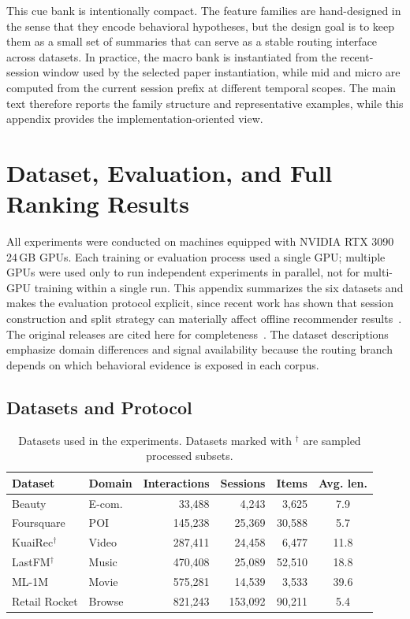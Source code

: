 \documentclass[sigconf,review,anonymous]{acmart}
\begin{document}
This cue bank is intentionally compact. The feature families are hand-designed in the sense that they encode behavioral hypotheses, but the design goal is to keep them as a small set of summaries that can serve as a stable routing interface across datasets. In practice, the macro bank is instantiated from the recent-session window used by the selected paper instantiation, while mid and micro are computed from the current session prefix at different temporal scopes. The main text therefore reports the family structure and representative examples, while this appendix provides the implementation-oriented view.

\section{Dataset, Evaluation, and Full Ranking Results}

All experiments were conducted on machines equipped with NVIDIA RTX 3090 24\,GB GPUs. Each training or evaluation process used a single GPU; multiple GPUs were used only to run independent experiments in parallel, not for multi-GPU training within a single run.
\label{app:data-details}
This appendix summarizes the six datasets and makes the evaluation protocol explicit, since recent work has shown that session construction and split strategy can materially affect offline recommender results~\cite{ji2023leakage,gusak2025timesplit}. The original releases are cited here for completeness~\cite{mcauley2015amazon,yang2015foursquare,gao2022kuairec,celma2010music,harper2015movielens,retailrocket2015dataset}. The dataset descriptions emphasize domain differences and signal availability because the routing branch depends on which behavioral evidence is exposed in each corpus.

\subsection{Datasets and Protocol}

\begin{table}[H]
  \caption{Datasets used in the experiments. Datasets marked with $^\dagger$ are sampled processed subsets.}
  \label{tab:appendix-datasets}
  \centering
  \footnotesize
  \setlength{\tabcolsep}{3.0pt}
  \begin{tabular*}{\columnwidth}{@{\extracolsep{\fill}}llrrrc@{}}
    \toprule
    Dataset & Domain & Interactions & Sessions & Items & Avg. len. \\
    \midrule
    Beauty & E-com. & 33,488 & 4,243 & 3,625 & 7.9 \\
    Foursquare & POI & 145,238 & 25,369 & 30,588 & 5.7 \\
    KuaiRec$^\dagger$ & Video & 287,411 & 24,458 & 6,477 & 11.8 \\
    LastFM$^\dagger$ & Music & 470,408 & 25,089 & 52,510 & 18.8 \\
    ML-1M & Movie & 575,281 & 14,539 & 3,533 & 39.6 \\
    Retail Rocket & Browse & 821,243 & 153,092 & 90,211 & 5.4 \\
    \bottomrule
  \end{tabular*}
\end{table}
\end{document}
